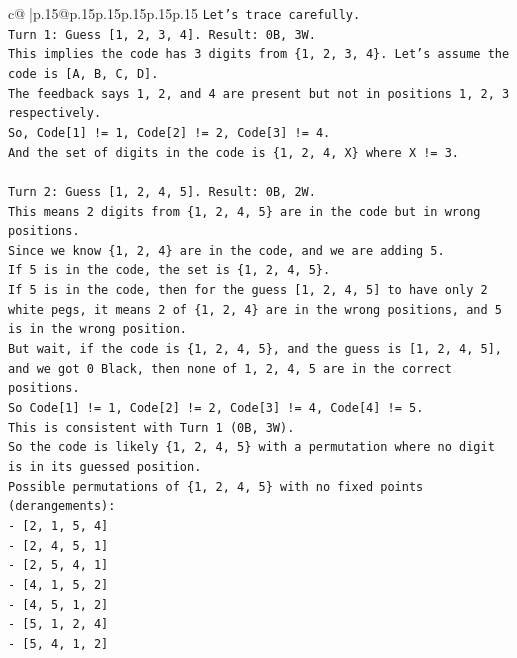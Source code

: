 \documentclass{article}
\begin{document}
{\begin{supertabular}{c@{$\;$}|p{.15\linewidth}@{}p{.15\linewidth}p{.15\linewidth}p{.15\linewidth}p{.15\linewidth}p{.15\linewidth}}
{{{\texttt{Let's trace carefully.} \\
\texttt{Turn 1: Guess {[}1, 2, 3, 4{]}. Result: 0B, 3W.} \\
\texttt{This implies the code has 3 digits from \{1, 2, 3, 4\}. Let's assume the code is {[}A, B, C, D{]}.} \\
\texttt{The feedback says 1, 2, and 4 are present but not in positions 1, 2, 3 respectively.} \\
\texttt{So, Code{[}1{]} != 1, Code{[}2{]} != 2, Code{[}3{]} != 4.} \\
\texttt{And the set of digits in the code is \{1, 2, 4, X\} where X != 3.} \\
\\ 
\texttt{Turn 2: Guess {[}1, 2, 4, 5{]}. Result: 0B, 2W.} \\
\texttt{This means 2 digits from \{1, 2, 4, 5\} are in the code but in wrong positions.} \\
\texttt{Since we know \{1, 2, 4\} are in the code, and we are adding 5.} \\
\texttt{If 5 is in the code, the set is \{1, 2, 4, 5\}.} \\
\texttt{If 5 is in the code, then for the guess {[}1, 2, 4, 5{]} to have only 2 white pegs, it means 2 of \{1, 2, 4\} are in the wrong positions, and 5 is in the wrong position.} \\
\texttt{But wait, if the code is \{1, 2, 4, 5\}, and the guess is {[}1, 2, 4, 5{]}, and we got 0 Black, then none of 1, 2, 4, 5 are in the correct positions.} \\
\texttt{So Code{[}1{]} != 1, Code{[}2{]} != 2, Code{[}3{]} != 4, Code{[}4{]} != 5.} \\
\texttt{This is consistent with Turn 1 (0B, 3W).} \\
\texttt{So the code is likely \{1, 2, 4, 5\} with a permutation where no digit is in its guessed position.} \\
\texttt{Possible permutations of \{1, 2, 4, 5\} with no fixed points (derangements):} \\
\texttt{{-} {[}2, 1, 5, 4{]}} \\
\texttt{{-} {[}2, 4, 5, 1{]}} \\
\texttt{{-} {[}2, 5, 4, 1{]}} \\
\texttt{{-} {[}4, 1, 5, 2{]}} \\
\texttt{{-} {[}4, 5, 1, 2{]}} \\
\texttt{{-} {[}5, 1, 2, 4{]}} \\
\texttt{{-} {[}5, 4, 1, 2{]}} \\
}}}
\end{supertabular}}
\end{document}
